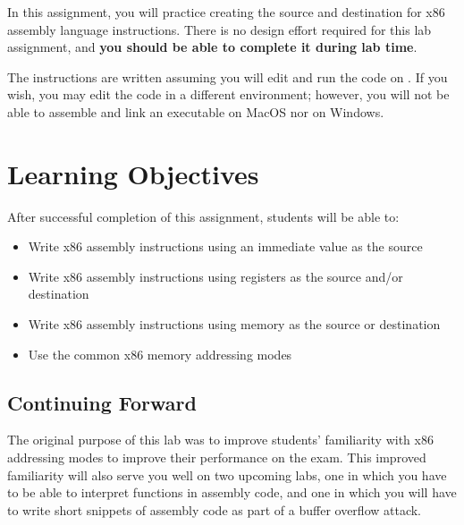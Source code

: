 


\renewcommand{\labnumber}{5}
\renewcommand{\labname}{x86 Addressing Modes Lab}
\renewcommand{\shortlabname}{addressinglab}
\renewcommand{\collaborationrules}{\individualeffort}
\renewcommand{\duedate}{Week of February 28, before the start of your lab section}
\startdocument




In this assignment, you will practice creating the source and destination for
x86 assembly language instructions. There is no design effort required for this
lab assignment, and \textbf{you should be able to complete it during lab time}.

The instructions are written assuming you will edit and run the code on
\runtimeenvironment. If you wish, you may edit the code in a different
environment; however, you will not be able to assemble and link an executable
on MacOS nor on Windows.

\section*{Learning Objectives}

After successful completion of this assignment, students will be able to:
\begin{itemize}
\item Write x86 assembly instructions using an immediate value as the source
\item Write x86 assembly instructions using registers as the source and/or
    destination
\item Write x86 assembly instructions using memory as the source or destination
\item Use the common x86 memory addressing modes
\end{itemize}

\subsection*{Continuing Forward}

The original purpose of this lab was to improve students' familiarity with
x86 addressing modes to improve their performance on the exam. This improved
familiarity will also serve you well on two upcoming labs, one in which you have
to be able to interpret functions in assembly code, and one in which you will
have to write short snippets of assembly code as part of a buffer overflow
attack.

